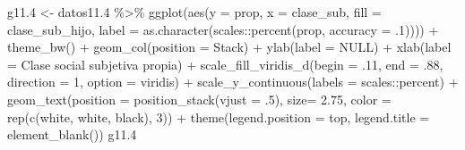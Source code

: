 \documentclass[
  12pt,
]{book}
\newenvironment{Shaded}{\begin{snugshade}}{\end{snugshade}}
\newcommand{\AttributeTok}[1]{\textcolor[rgb]{0.77,0.63,0.00}{#1}}
\newcommand{\ConstantTok}[1]{\textcolor[rgb]{0.00,0.00,0.00}{#1}}
\newcommand{\DecValTok}[1]{\textcolor[rgb]{0.00,0.00,0.81}{#1}}
\newcommand{\FloatTok}[1]{\textcolor[rgb]{0.00,0.00,0.81}{#1}}
\newcommand{\FunctionTok}[1]{\textcolor[rgb]{0.00,0.00,0.00}{#1}}
\newcommand{\NormalTok}[1]{#1}
\newcommand{\OtherTok}[1]{\textcolor[rgb]{0.56,0.35,0.01}{#1}}
\newcommand{\SpecialCharTok}[1]{\textcolor[rgb]{0.00,0.00,0.00}{#1}}
\newcommand{\StringTok}[1]{\textcolor[rgb]{0.31,0.60,0.02}{#1}}
\begin{document}
\begin{Shaded}
\begin{Highlighting}[]
\NormalTok{g11}\FloatTok{.4} \OtherTok{\textless{}{-}}\NormalTok{ datos11}\FloatTok{.4} \SpecialCharTok{\%\textgreater{}\%} 
  \FunctionTok{ggplot}\NormalTok{(}\FunctionTok{aes}\NormalTok{(}\AttributeTok{y =}\NormalTok{ prop, }\AttributeTok{x =}\NormalTok{ clase\_sub, }\AttributeTok{fill =}\NormalTok{ clase\_sub\_hijo, }
             \AttributeTok{label =} \FunctionTok{as.character}\NormalTok{(scales}\SpecialCharTok{::}\FunctionTok{percent}\NormalTok{(prop, }\AttributeTok{accuracy =}\NormalTok{ .}\DecValTok{1}\NormalTok{)))) }\SpecialCharTok{+} 
  \FunctionTok{theme\_bw}\NormalTok{() }\SpecialCharTok{+} 
  \FunctionTok{geom\_col}\NormalTok{(}\AttributeTok{position =} \StringTok{\textquotesingle{}Stack\textquotesingle{}}\NormalTok{) }\SpecialCharTok{+}
  \FunctionTok{ylab}\NormalTok{(}\AttributeTok{label =} \ConstantTok{NULL}\NormalTok{) }\SpecialCharTok{+}
  \FunctionTok{xlab}\NormalTok{(}\AttributeTok{label =} \StringTok{\textquotesingle{}Clase social subjetiva propia\textquotesingle{}}\NormalTok{) }\SpecialCharTok{+}
  \FunctionTok{scale\_fill\_viridis\_d}\NormalTok{(}\AttributeTok{begin =}\NormalTok{ .}\DecValTok{11}\NormalTok{, }\AttributeTok{end =}\NormalTok{ .}\DecValTok{88}\NormalTok{, }\AttributeTok{direction =} \DecValTok{1}\NormalTok{, }\AttributeTok{option =} \StringTok{\textquotesingle{}viridis\textquotesingle{}}\NormalTok{) }\SpecialCharTok{+}
  \FunctionTok{scale\_y\_continuous}\NormalTok{(}\AttributeTok{labels =}\NormalTok{ scales}\SpecialCharTok{::}\NormalTok{percent) }\SpecialCharTok{+} 
  \FunctionTok{geom\_text}\NormalTok{(}\AttributeTok{position =} \FunctionTok{position\_stack}\NormalTok{(}\AttributeTok{vjust =}\NormalTok{ .}\DecValTok{5}\NormalTok{),}
            \AttributeTok{size=} \FloatTok{2.75}\NormalTok{, }\AttributeTok{color =} \FunctionTok{rep}\NormalTok{(}\FunctionTok{c}\NormalTok{(}\StringTok{\textquotesingle{}white\textquotesingle{}}\NormalTok{, }\StringTok{\textquotesingle{}white\textquotesingle{}}\NormalTok{, }\StringTok{\textquotesingle{}black\textquotesingle{}}\NormalTok{), }\DecValTok{3}\NormalTok{)) }\SpecialCharTok{+} 
  \FunctionTok{theme}\NormalTok{(}\AttributeTok{legend.position =} \StringTok{\textquotesingle{}top\textquotesingle{}}\NormalTok{,}
        \AttributeTok{legend.title =} \FunctionTok{element\_blank}\NormalTok{())}
\NormalTok{g11}\FloatTok{.4}
\end{Highlighting}
\end{Shaded}
\end{document}
